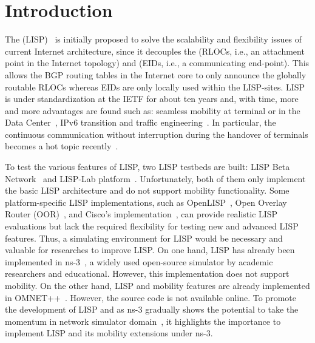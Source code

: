 \section{Introduction}\label{sec:intro}

The  (LISP)~\cite{rfc6830} is
initially proposed to solve the scalability and flexibility issues of current
Internet architecture, since it decouples the  (RLOCs,
i.e., an attachment point in the Internet topology) and  (EIDs, i.e., a communicating end-point). This allows the BGP
routing tables in the Internet core to only announce the globally routable RLOCs
whereas EIDs are only locally used within the LISP-sites. LISP is under
standardization at the IETF for about ten years and, with time, more and more
advantages are found such as: seamless mobility at terminal or in the Data
Center~\cite{saucez2016locator}, IPv6 transition and traffic
engineering~\cite{saucez2012designing}. In particular, the continuous
communication without interruption during the handover of terminals becomes a
hot topic recently~\cite{phoomikiattisak2016control}.

To test the various features of LISP, two LISP testbeds are built: LISP Beta
Network~\cite{lispbeta} and LISP-Lab platform~\cite{lisplab}. Unfortunately, both of
them only implement the basic LISP architecture and do not support mobility
functionality. Some platform-specific LISP implementations, such as
OpenLISP~\cite{phung2014openlisp}, Open Overlay Router (OOR)~\cite{LISPmob}, and
Cisco's implementation~\cite{CiscoIOS}, can provide realistic LISP evaluations
but lack the required flexibility for testing new and advanced LISP features.
Thus, a simulating environment for LISP would be necessary and valuable for researches to improve LISP.
 On
one hand, LISP has already been implemented in
ns-3~\cite{lezama2009implementation}, a widely used open-source simulator by
academic researchers and educational.  However, this implementation does not
support mobility.  On the other hand, LISP and mobility features are already
implemented in OMNET++~\cite{klein2012integration}. However, the source code is
not available online. To promote the development of LISP and as ns-3 gradually
shows the potential to take the momentum in network simulator
domain~\cite{rana2017implementation}, it highlights the importance to implement
LISP and its mobility extensions under ns-3. %

